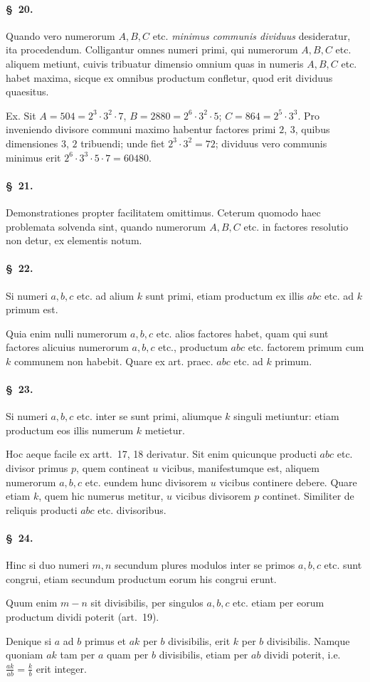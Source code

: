\documentclass[12pt,a4paper]{article}
\theoremstyle{plain}
\theoremstyle{definition}
\theoremstyle{remark}
\newcommand{\art}[1]{\paragraph{\S\ #1.}}
\begin{document}
\art{20}
Quando vero numerorum $A, B, C$ etc. \emph{minimus communis dividuus} desideratur, ita procedendum. Colligantur omnes numeri primi, qui numerorum $A, B, C$ etc. aliquem metiunt, cuivis tribuatur dimensio omnium quas in numeris $A, B, C$ etc. habet maxima, sicque ex omnibus productum confletur, quod erit dividuus quaesitus.

Ex. Sit $A = 504 = 2^3 \cdot 3^2 \cdot 7$, $B = 2880 = 2^6 \cdot 3^2 \cdot 5$; $C = 864 = 2^5 \cdot 3^3$. Pro inveniendo divisore communi maximo habentur factores primi $2$, $3$, quibus dimensiones $3$, $2$ tribuendi; unde fiet $2^3 \cdot 3^2 = 72$; dividuus vero communis minimus erit $2^6 \cdot 3^3 \cdot 5 \cdot 7 = 60480$.

\art{21}
Demonstrationes propter facilitatem omittimus. Ceterum quomodo haec problemata solvenda sint, quando numerorum $A, B, C$ etc. in factores resolutio non detur, ex elementis notum.

\art{22}
Si numeri $a, b, c$ etc. ad alium $k$ sunt primi, etiam productum ex illis $abc$ etc. ad $k$ primum est.

Quia enim nulli numerorum $a, b, c$ etc. alios factores habet, quam qui sunt factores alicuius numerorum $a, b, c$ etc., productum $abc$ etc. factorem primum cum $k$ communem non habebit. Quare ex art. praec. $abc$ etc. ad $k$ primum.

\art{23}
Si numeri $a, b, c$ etc. inter se sunt primi, aliumque $k$ singuli metiuntur: etiam productum eos illis numerum $k$ metietur.

Hoc aeque facile ex artt.~17, 18 derivatur. Sit enim quicunque producti $abc$ etc. divisor primus $p$, quem contineat $u$ vicibus, manifestumque est, aliquem numerorum $a, b, c$ etc. eundem hunc divisorem $u$ vicibus continere debere. Quare etiam $k$, quem hic numerus metitur, $u$ vicibus divisorem $p$ continet. Similiter de reliquis producti $abc$ etc. divisoribus.

\art{24}
Hinc si duo numeri $m, n$ secundum plures modulos inter se primos $a, b, c$ etc. sunt congrui, etiam secundum productum eorum his congrui erunt.

Quum enim $m - n$ sit divisibilis, per singulos $a, b, c$ etc. etiam per eorum productum dividi poterit (art.~19).

Denique si $a$ ad $b$ primus et $ak$ per $b$ divisibilis, erit $k$ per $b$ divisibilis. Namque quoniam $ak$ tam per $a$ quam per $b$ divisibilis, etiam per $ab$ dividi poterit, i.e. $\frac{ak}{ab} = \frac{k}{b}$ erit integer.
\end{document}
